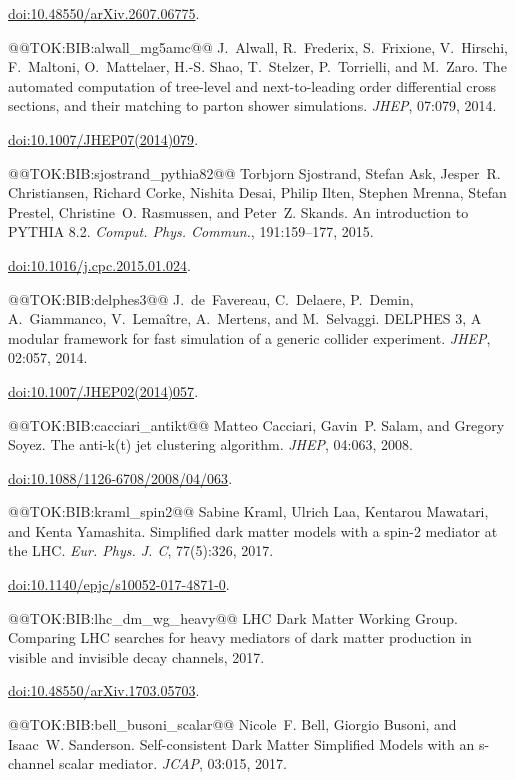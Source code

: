 \documentclass{article}
\begin{document}
  \href{https://doi.org/10.48550/arXiv.2607.06775}{doi:10.48550/arXiv.2607.06775}.

@@TOK:BIB:alwall_mg5amc@@ J.~Alwall, R.~Frederix, S.~Frixione, V.~Hirschi, F.~Maltoni, O.~Mattelaer,
  H.-S. Shao, T.~Stelzer, P.~Torrielli, and M.~Zaro.
  {The automated computation of tree-level and next-to-leading order
  differential cross sections, and their matching to parton shower
  simulations}.
  {\em JHEP}, 07:079, 2014.
 
  \href{https://doi.org/10.1007/JHEP07(2014)079}{doi:10.1007/JHEP07(2014)079}.

@@TOK:BIB:sjostrand_pythia82@@ Torbjorn Sjostrand, Stefan Ask, Jesper~R. Christiansen, Richard Corke, Nishita
  Desai, Philip Ilten, Stephen Mrenna, Stefan Prestel, Christine~O. Rasmussen,
  and Peter~Z. Skands.
  {An introduction to PYTHIA 8.2}.
  {\em Comput. Phys. Commun.}, 191:159--177, 2015.
 
  \href{https://doi.org/10.1016/j.cpc.2015.01.024}{doi:10.1016/j.cpc.2015.01.024}.

@@TOK:BIB:delphes3@@ J.~de~Favereau, C.~Delaere, P.~Demin, A.~Giammanco, V.~Lema{\^i}tre,
  A.~Mertens, and M.~Selvaggi.
  {DELPHES 3, A modular framework for fast simulation of a generic
  collider experiment}.
  {\em JHEP}, 02:057, 2014.
 
  \href{https://doi.org/10.1007/JHEP02(2014)057}{doi:10.1007/JHEP02(2014)057}.

@@TOK:BIB:cacciari_antikt@@ Matteo Cacciari, Gavin~P. Salam, and Gregory Soyez.
  {The anti-k(t) jet clustering algorithm}.
  {\em JHEP}, 04:063, 2008.
 
  \href{https://doi.org/10.1088/1126-6708/2008/04/063}{doi:10.1088/1126-6708/2008/04/063}.

@@TOK:BIB:kraml_spin2@@ Sabine Kraml, Ulrich Laa, Kentarou Mawatari, and Kenta Yamashita.
  {Simplified dark matter models with a spin-2 mediator at the LHC}.
  {\em Eur. Phys. J. C}, 77(5):326, 2017.
 
  \href{https://doi.org/10.1140/epjc/s10052-017-4871-0}{doi:10.1140/epjc/s10052-017-4871-0}.

@@TOK:BIB:lhc_dm_wg_heavy@@ {LHC Dark Matter Working Group}.
  {Comparing LHC searches for heavy mediators of dark matter production
  in visible and invisible decay channels}, 2017.
 
  \href{https://doi.org/10.48550/arXiv.1703.05703}{doi:10.48550/arXiv.1703.05703}.

@@TOK:BIB:bell_busoni_scalar@@ Nicole~F. Bell, Giorgio Busoni, and Isaac~W. Sanderson.
  {Self-consistent Dark Matter Simplified Models with an s-channel
  scalar mediator}.
  {\em JCAP}, 03:015, 2017.
 
\end{document}
